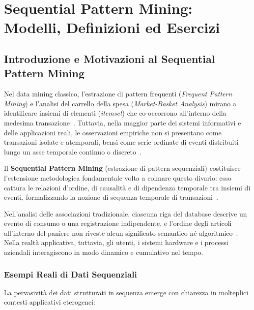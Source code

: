 \chapter{Sequential Pattern Mining: Modelli, Definizioni ed Esercizi}
\label{chap:dm-sequential-pattern-mining}

\FloatBarrier
\section{Introduzione e Motivazioni al Sequential Pattern Mining}
\label{sec:dm-seq-intro}

Nel data mining classico, l'estrazione di pattern frequenti (\textit{Frequent Pattern Mining}) e l'analisi del carrello della spesa (\textit{Market-Basket Analysis}) mirano a identificare insiemi di elementi (\textit{itemset}) che co-occorrono all'interno della medesima transazione~\cite{tan2018, agrawal1994}. Tuttavia, nella maggior parte dei sistemi informativi e delle applicazioni reali, le osservazioni empiriche non si presentano come transazioni isolate e atemporali, bensì come serie ordinate di eventi distribuiti lungo un asse temporale continuo o discreto~\cite{agrawal1995, srikant1996}.

Il \textbf{Sequential Pattern Mining} (estrazione di pattern sequenziali) costituisce l'estensione metodologica fondamentale volta a colmare questo divario: esso cattura le relazioni d'ordine, di causalità e di dipendenza temporale tra insiemi di eventi, formalizzando la nozione di sequenza temporale di transazioni~\cite{tan2018, agrawal1995}.

Nell'analisi delle associazioni tradizionale, ciascuna riga del database descrive un evento di consumo o una registrazione indipendente, e l'ordine degli articoli all'interno del paniere non riveste alcun significato semantico né algoritmico~\cite{tan2018}. Nella realtà applicativa, tuttavia, gli utenti, i sistemi hardware e i processi aziendali interagiscono in modo dinamico e cumulativo nel tempo.

\FloatBarrier
\subsection{Esempi Reali di Dati Sequenziali}
La pervasività dei dati strutturati in sequenza emerge con chiarezza in molteplici contesti applicativi eterogenei:


